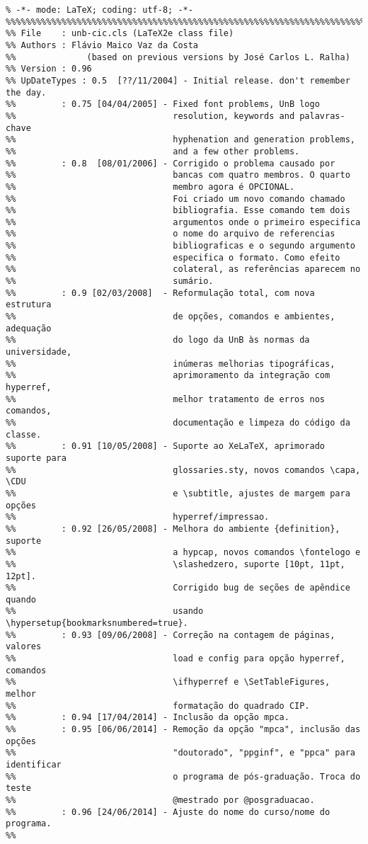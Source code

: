 \small\begin{verbatim}
% -*- mode: LaTeX; coding: utf-8; -*-
%%%%%%%%%%%%%%%%%%%%%%%%%%%%%%%%%%%%%%%%%%%%%%%%%%%%%%%%%%%%%%%%%%%%%%%%%%%%%%%
%% File    : unb-cic.cls (LaTeX2e class file)
%% Authors : Flávio Maico Vaz da Costa
%%              (based on previous versions by José Carlos L. Ralha)
%% Version : 0.96
%% UpDateTypes : 0.5  [??/11/2004] - Initial release. don't remember the day.
%%         : 0.75 [04/04/2005] - Fixed font problems, UnB logo
%%                               resolution, keywords and palavras-chave
%%                               hyphenation and generation problems,
%%                               and a few other problems.
%%         : 0.8  [08/01/2006] - Corrigido o problema causado por
%%                               bancas com quatro membros. O quarto
%%                               membro agora é OPCIONAL.
%%                               Foi criado um novo comando chamado
%%                               bibliografia. Esse comando tem dois
%%                               argumentos onde o primeiro especifica
%%                               o nome do arquivo de referencias
%%                               bibliograficas e o segundo argumento
%%                               especifica o formato. Como efeito
%%                               colateral, as referências aparecem no
%%                               sumário.
%%         : 0.9 [02/03/2008]  - Reformulação total, com nova estrutura
%%                               de opções, comandos e ambientes, adequação
%%                               do logo da UnB às normas da universidade,
%%                               inúmeras melhorias tipográficas,
%%                               aprimoramento da integração com hyperref,
%%                               melhor tratamento de erros nos comandos,
%%                               documentação e limpeza do código da classe.
%%         : 0.91 [10/05/2008] - Suporte ao XeLaTeX, aprimorado suporte para
%%                               glossaries.sty, novos comandos \capa, \CDU
%%                               e \subtitle, ajustes de margem para opções
%%                               hyperref/impressao.
%%         : 0.92 [26/05/2008] - Melhora do ambiente {definition}, suporte
%%                               a hypcap, novos comandos \fontelogo e
%%                               \slashedzero, suporte [10pt, 11pt, 12pt].
%%                               Corrigido bug de seções de apêndice quando
%%                               usando \hypersetup{bookmarksnumbered=true}.
%%         : 0.93 [09/06/2008] - Correção na contagem de páginas, valores
%%                               load e config para opção hyperref, comandos
%%                               \ifhyperref e \SetTableFigures, melhor
%%                               formatação do quadrado CIP. 
%%         : 0.94 [17/04/2014] - Inclusão da opção mpca. 
%%         : 0.95 [06/06/2014] - Remoção da opção "mpca", inclusão das opções
%%                               "doutorado", "ppginf", e "ppca" para identificar
%%                               o programa de pós-graduação. Troca do teste 
%%                               @mestrado por @posgraduacao.
%%         : 0.96 [24/06/2014] - Ajuste do nome do curso/nome do programa.
%%
\end{verbatim}